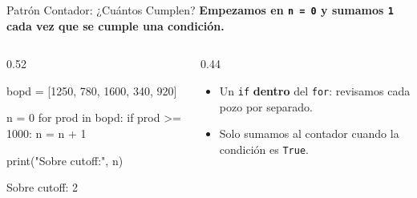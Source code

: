 \documentclass[aspectratio=169, 11pt]{beamer}
\begin{document}
\begin{frame}[fragile,shrink=18]{Patrón Contador: ¿Cuántos Cumplen?}
  \vspace{-4pt}
  {\small\color{arcaDark}\bfseries
    Empezamos en \texttt{n = 0} y sumamos \texttt{1} cada vez que se cumple una condición.}

  \vspace{5pt}
  \begin{columns}[T]
    \begin{column}{0.52\textwidth}
      \begin{pyblock}
bopd = [1250, 780, 1600, 340, 920]

n = 0
for prod in bopd:
    if prod >= 1000:
        n = n + 1

print("Sobre cutoff:", n)
      \end{pyblock}
      \vspace{2pt}
      \begin{outputblock}
Sobre cutoff: 2
      \end{outputblock}
    \end{column}

    \begin{column}{0.44\textwidth}
      {\scriptsize\color{textMuted}
      \begin{itemize}\setlength{\itemsep}{5pt}
        \item[{\color{arcaRed}\scriptsize\faArrowRight}]
          Un \texttt{if} \textbf{dentro} del \texttt{for}:
          revisamos cada pozo por separado.
        \item[{\color{arcaRed}\scriptsize\faArrowRight}]
          Solo sumamos al contador cuando la
          condición es \texttt{True}.
      \end{itemize}
      }
    \end{column}
  \end{columns}
\end{frame}
\end{document}
